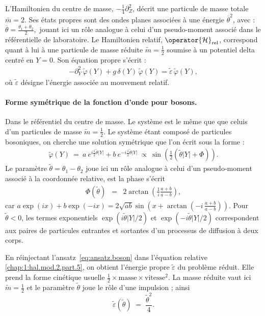 L’Hamiltonien du centre de masse, \(-\frac{1}{4} \partial_Z^2\), décrit une particule de masse totale \(\bar{m} = 2\). Ses états propres sont des ondes planes associées à une énergie \(\overline{\theta}^2\), avec :
\(
\overline{\theta} = \frac{\theta_1 + \theta_2}{2},
\)
jouant ici un rôle analogue à celui d’un pseudo-moment associé dans le référentielle de laboratoire.
Le Hamiltonien relatif, \(\operator{\mathcal{H}}_{\text{rel}}\), correspond quant à lui à une particule de masse réduite \(\tilde{m} = \frac{1}{2}\) soumise à un potentiel delta centré en \(Y = 0\). Son équation propre s’écrit :
\begin{eqnarray}\label{chap:1:hal.mod.2.part.5}
	- \partial_Y^2 \, \tilde{\varphi}(Y) + g \, \delta(Y) \, \tilde{\varphi}(Y) = \tilde{\varepsilon} \, \tilde{\varphi}(Y),
\end{eqnarray}
où \(\tilde{\varepsilon}\) désigne l’énergie associée au mouvement relatif.

\paragraph{Forme symétrique de la fonction d'onde pour bosons.}
Dans le référentiel du centre de masse. Le système est le même que que celuis d'un particules de masse $\tilde{m}= \frac{1}{2}$.
Le système étant composé de particules bosoniques, on cherche une solution symétrique que l’on écrit sous la forme  :
\begin{eqnarray}
	\tilde{\varphi}(Y) ~=~a~e^{i\frac{1}{2} \tilde{\theta} \vert Y \vert } + b~e^{-i\frac{1}{2} \tilde{\theta}\vert Y \vert } ~\propto~  \sin\left( \frac{1}{2} (\tilde{\theta} |Y| + \Phi ) \right). \label{eq:ansatz.boson}
\end{eqnarray}
Le paramètre \( \tilde{\theta} = \theta_1 - \theta_2 \) joue ici un rôle analogue à celui d’un pseudo-moment associé à la coordonnée relative,
est  la phase s'écrit
\begin{eqnarray}
	\Phi(\tilde{\theta}) &=& 2 \arctan\left (\frac{1}{i} \frac{a+b}{a-b}\right),	\label{chap:1:dif.mod.2.part.1} 
\end{eqnarray}
car \( a\exp(ix)+b\exp(-ix) = 2\sqrt{ab}\sin\left(x+\arctan\left(-i\, \frac{a+b}{a-b}\right)\right) \). Pour $\tilde{\theta}<0$, les termes exponentiels \( \exp(i\tilde{\theta} \vert Y \vert/2 ) \) et \( \exp(-i\tilde{\theta} \vert Y \vert/2 ) \) correspondent aux paires de particules entrantes et sortantes d’un processus de diffusion à deux corps.

En réinjectant l’ansatz~\eqref{eq:ansatz.boson} dans l’équation relative
\eqref{chap:1:hal.mod.2.part.5}, on obtient l’énergie propre
\(\tilde{\varepsilon}\) du problème réduit.  
Elle prend la forme cinétique usuelle
\(\tfrac{1}{2}\times\text{masse}\times\text{vitesse}^{2}\).  
La masse réduite vaut ici \(\tilde{m}= \frac{1}{2}\) et le paramètre
\(\tilde{\theta}\) joue le rôle d’une impulsion ; ainsi
\begin{equation}
   \tilde{\varepsilon}(\tilde{\theta})
   \;=\;\frac{\tilde{\theta}^{2}}{4}.
   \label{eq:energie_relative}
\end{equation}

